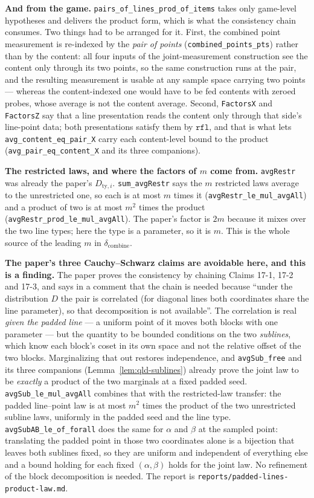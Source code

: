 \textbf{And from the game.} \texttt{pairs\_of\_lines\_prod\_of\_items} takes only game-level
hypotheses and delivers the product form, which is what the consistency chain consumes. Two things
had to be arranged for it. First, the combined point measurement is re-indexed by the \emph{pair of
points} (\texttt{combined\_points\_pts}) rather than by the content: all four inputs of the
joint-measurement construction see the content only through its two points, so the same construction
runs at the pair, and the resulting measurement is usable at any sample space carrying two points ---
whereas the content-indexed one would have to be fed contents with zeroed probes, whose average is
not the content average. Second, \texttt{FactorsX} and \texttt{FactorsZ} say that a line
presentation reads the content only through that side's line-point data; both presentations satisfy
them by $\mathtt{rfl}$, and that is what lets \texttt{avg\_content\_eq\_pair\_X} carry each
content-level bound to the product (\texttt{avg\_pair\_eq\_content\_X} and its three
companions).

\textbf{The restricted laws, and where the factors of $m$ come from.} \texttt{avgRestr} was already
the paper's $D_{\mathrm{ty},i}$. \texttt{sum\_avgRestr} says the $m$ restricted laws average to the
unrestricted one, so each is at most $m$ times it (\texttt{avgRestr\_le\_mul\_avgAll}) and a
product of two is at most $m^2$ times the product
(\texttt{avgRestr\_prod\_le\_mul\_avgAll}). The paper's factor is $2m$ because it mixes over the
two line types; here the type is a parameter, so it is $m$. This is the whole source of the leading
$m$ in $\delta_{\mathrm{combine}}$.

\textbf{The paper's three Cauchy--Schwarz claims are avoidable here, and this is a finding.} The
paper proves the consistency by chaining Claims 17-1, 17-2 and 17-3, and says in a comment that the
chain is needed because ``under the distribution $D$ the pair is correlated (for diagonal lines both
coordinates share the line parameter), so that decomposition is not available''. The correlation is
real \emph{given the padded line} --- a uniform point of it moves both blocks with one parameter ---
but the quantity to be bounded conditions on the two \emph{sublines}, which know each block's coset
in its own space and not the relative offset of the two blocks. Marginalizing that out restores
independence, and \texttt{avgSub\_free} and its three companions
(Lemma~\ref{lem:qld-sublines}) already prove the joint law to be \emph{exactly} a product of the two
marginals at a fixed padded seed. \texttt{avgSub\_le\_mul\_avgAll} combines that with the
restricted-law transfer: the padded line--point law is at most $m^2$ times the product of the two
unrestricted subline laws, uniformly in the padded seed and the line type.
\texttt{avgSubAB\_le\_of\_forall} does the same for $\alpha$ and $\beta$ at the sampled point:
translating the padded point in those two coordinates alone is a bijection that leaves both sublines
fixed, so they are uniform and independent of everything else and a bound holding for each fixed
$(\alpha,\beta)$ holds for the joint law. No refinement of the block decomposition is needed. The
report is \texttt{reports/padded-lines-product-law.md}.

